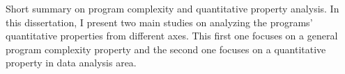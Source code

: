 Short summary on program complexity and quantitative property analysis.
In this dissertation, I present two main studies on analyzing the programs' quantitative properties from different axes.
This first one focuses on a general program complexity property
and the second one focuses on a quantitative property in data analysis area.